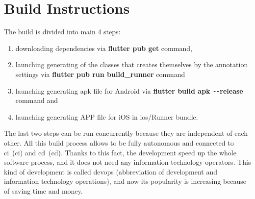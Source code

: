 \section{Build Instructions}\label{sec:build-instructions}
The build is divided into main 4 steps:
\begin{enumerate}
    \item downloading dependencies via \textbf{flutter pub get} command,
    \item launching generating of the classes that creates themselves by the annotation settings via \textbf{flutter pub run build\_runner} command
    \item launching generating \acrshort{apk} file for Android via \textbf{flutter build apk \newline\texttt{-{}-}release} command and
    \item launching generating APP file for iOS in ios/Runner bundle.
\end{enumerate}

The last two steps can be run concurrently because they are independent of each other.
All this build process allows to be fully autonomous and connected to \acrshort{ci}~(\acrlong{ci}) and \acrshort{cd}~(\acrlong{cd}).
Thanks to this fact, the development speed up the whole software process, and it does not need any information technology operators.
This kind of development is called \acrshort{devops} (abbreviation of development and information technology operations), and now its popularity is increasing because of saving time and money.
